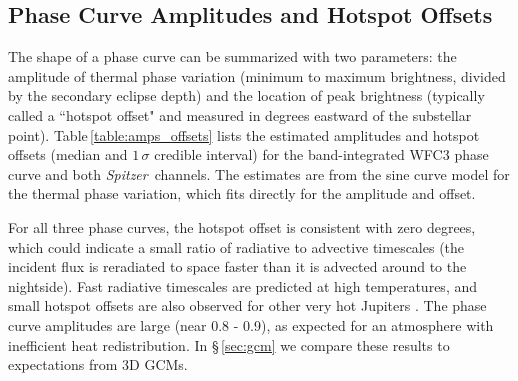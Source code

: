 \documentclass[twocolumn]{aastex61}
\newcommand{\project}[1]{\textsl{#1}}
\newcommand{\Spitzer}{\project{Spitzer}}
\begin{document}
\subsection{Phase Curve Amplitudes and Hotspot Offsets}
The shape of a phase curve can be summarized with two parameters: the amplitude of thermal phase variation (minimum to maximum brightness, divided by the secondary eclipse depth) and the location of peak brightness (typically called a ``hotspot offset" and measured in degrees eastward of the substellar point).  Table\,\ref{table:amps_offsets} lists the estimated amplitudes and hotspot offsets (median and $1\,\sigma$ credible interval) for the band-integrated WFC3 phase curve and both \Spitzer\ channels. The estimates are from the sine curve model for the thermal phase variation, which fits directly for the amplitude and offset. 

For all three phase curves, the hotspot offset is consistent with zero degrees, which could indicate a small ratio of radiative to advective timescales (the incident flux is reradiated to space faster than it is advected around to the nightside). Fast radiative timescales are predicted at high temperatures, and small hotspot offsets are also observed for other very hot Jupiters \citep{perez13, komacek16, komacek17}.  The phase curve amplitudes are large (near 0.8 - 0.9), as expected for an atmosphere with inefficient heat redistribution. In \S\,\ref{sec:gcm} we compare these results to expectations from 3D GCMs.

\end{document}
